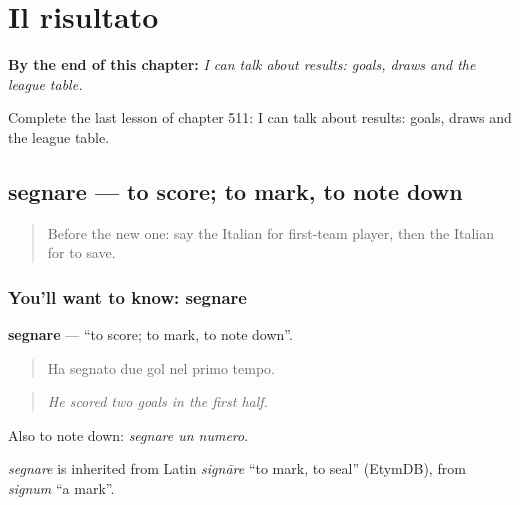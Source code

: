 
\chapter{Il risultato}
\label{ch:it-il-risultato}

\begin{chapteropening}
\textbf{By the end of this chapter:} \emph{I can talk about results: goals, draws and the league table.}

Complete the last lesson of chapter 511: I can talk about results: goals, draws and the league table.
\end{chapteropening}

\section[segnare]{segnare — to score; to mark, to note down}

\label{lesson:IT-C511-segnare}



\begin{quote}
Before the new one: say the Italian for first-team player, then the Italian for to save.
\end{quote}

\subsection*{You'll want to know: segnare}
\textbf{segnare} — \textquotedblleft{}to score; to mark, to note down\textquotedblright{}.

\begin{quote}
Ha segnato due gol nel primo tempo.
\end{quote}

\begin{quote}
\emph{He scored two goals in the first half.}
\end{quote}

Also to note down: \emph{segnare un numero}.

\begin{cousinweb}
\emph{segnare} is inherited from Latin \emph{signāre} \textquotedblleft{}to mark, to seal\textquotedblright{} (EtymDB), from \emph{signum} \textquotedblleft{}a mark\textquotedblright{}.
\end{cousinweb}

